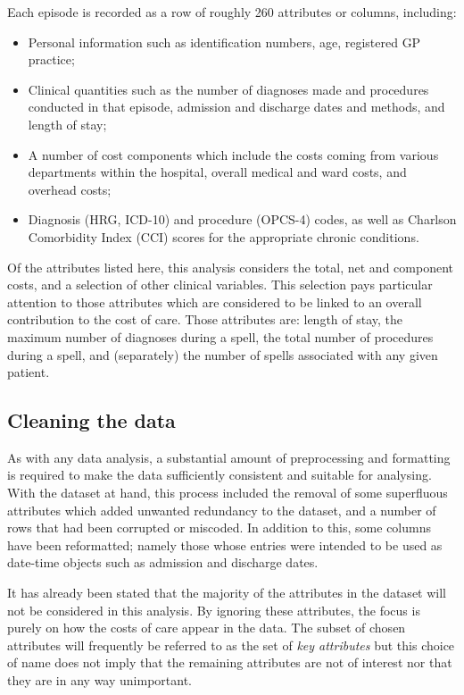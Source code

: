 Each episode is recorded as a row of roughly 260 attributes or columns,
including:
\begin{itemize}
    \item Personal information such as identification numbers, age, registered
        GP practice;
    \item Clinical quantities such as the number of diagnoses made and
        procedures conducted in that episode, admission and discharge dates and
        methods, and length of stay;
    \item A number of cost components which include the costs coming from
        various departments within the hospital, overall medical and ward costs,
        and overhead costs;
    \item Diagnosis (HRG, ICD-10) and procedure (OPCS-4) codes, as well as
        Charlson Comorbidity Index (CCI) scores for the appropriate chronic
        conditions.
\end{itemize}

Of the attributes listed here, this analysis considers the total, net and
component costs, and a selection of other clinical variables. This selection
pays particular attention to those attributes which are considered to be linked
to an overall contribution to the cost of care. Those attributes are: length of
stay, the maximum number of diagnoses during a spell, the total number of
procedures during a spell, and (separately) the number of spells associated with
any given patient.

\subsection{Cleaning the data}\label{subsec:formatting}

As with any data analysis, a substantial amount of preprocessing and
formatting is required to make the data sufficiently consistent and suitable
for analysing. With the dataset at hand, this process included the removal of
some superfluous attributes which added unwanted redundancy to the dataset, and
a number of rows that had been corrupted or miscoded. In addition to this, some
columns have been reformatted; namely those whose entries were intended to be
used as date-time objects such as admission and discharge dates.

It has already been stated that the majority of the attributes in the dataset
will not be considered in this analysis. By ignoring these attributes, the focus
is purely on how the costs of care appear in the data. The subset of chosen
attributes will frequently be referred to as the set of \emph{key attributes}
but this choice of name does not imply that the remaining attributes are not of
interest nor that they are in any way unimportant.

